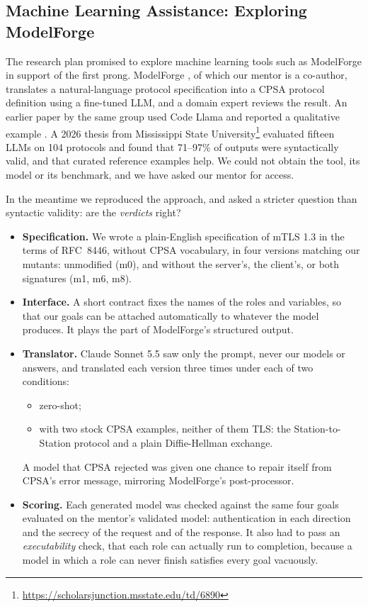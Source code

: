 \documentclass[11pt]{article}
\begin{document}
\subsection{Machine Learning Assistance: Exploring ModelForge}
\label{subsec:modelforge}
The research plan promised to explore machine learning tools such as ModelForge in support of the first prong. ModelForge \cite{10.1007/978-3-031-87496-3_10}, of which our mentor is a co-author, translates a natural-language protocol specification into a CPSA protocol definition using a fine-tuned LLM, and a domain expert reviews the result. An earlier paper by the same group used Code Llama and reported a qualitative example \cite{duclos2024rfc2cpsa}. A 2026 thesis from Mississippi State University\footnote{\url{https://scholarsjunction.msstate.edu/td/6890}} evaluated fifteen LLMs on 104 protocols and found that 71--97\% of outputs were syntactically valid, and that curated reference examples help. We could not obtain the tool, its model or its benchmark, and we have asked our mentor for access.

In the meantime we reproduced the approach, and asked a stricter question than syntactic validity: are the \textit{verdicts} right?
\begin{itemize}
    \item \textbf{Specification.} We wrote a plain-English specification of mTLS 1.3 in the terms of RFC~8446, without CPSA vocabulary, in four versions matching our mutants: unmodified (m0), and without the server's, the client's, or both signatures (m1, m6, m8).
    \item \textbf{Interface.} A short contract fixes the names of the roles and variables, so that our goals can be attached automatically to whatever the model produces. It plays the part of ModelForge's structured output.
    \item \textbf{Translator.} Claude Sonnet 5.5 saw only the prompt, never our models or answers, and translated each version three times under each of two conditions:
    \begin{itemize}
        \item zero-shot;
        \item with two stock CPSA examples, neither of them TLS: the Station-to-Station protocol \cite{diffie1992sts} and a plain Diffie-Hellman exchange.
    \end{itemize}
    A model that CPSA rejected was given one chance to repair itself from CPSA's error message, mirroring ModelForge's post-processor.
    \item \textbf{Scoring.} Each generated model was checked against the same four goals evaluated on the mentor's validated model: authentication in each direction and the secrecy of the request and of the response. It also had to pass an \textit{executability} check, that each role can actually run to completion, because a model in which a role can never finish satisfies every goal vacuously.
\end{itemize}
\end{document}
